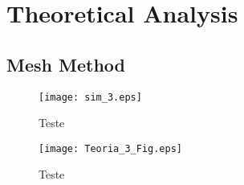 \section{Theoretical Analysis}
\label{sec:analysis}

\subsection{Mesh Method}
\label{subsec:mesh}

\begin{figure}[!ht] 
\caption{Teste}
\texttt{[image: sim\_3.eps]}
\label{fig:simulation_4}
\end{figure}


\begin{figure}[!ht]
\caption{Teste}
\texttt{[image: Teoria\_3\_Fig.eps]}
\label{fig:simulation_4}
\end{figure}





